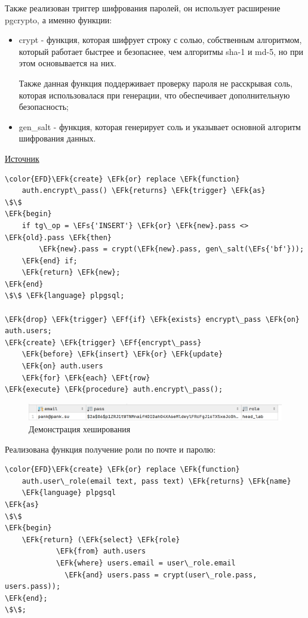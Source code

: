 \documentclass[14pt]{extarticle}
\newcommand{\EFs}[1]{\textcolor{EFs}{#1}} %
\newcommand{\EFk}[1]{\textcolor{EFk}{#1}} %
\newcommand{\EFf}[1]{\textcolor{EFf}{#1}} %
\newcommand{\EFt}[1]{\textcolor{EFt}{#1}} %
\begin{document}
Также реализован триггер шифрования паролей, он использует расширение pgcrypto, а
именно функции:
\begin{itemize}
\item crypt - функция, которая шифрует строку с солью,
собственным алгоритмом, который работает быстрее и безопаснее,
чем алгоритмы sha-1 и md-5, но при этом основывается на них.

Также данная функция поддерживает проверку пароля не расскрывая соль, которая использовалася при генерации,
что обеспечивает дополнительную безопасность;
\item gen\_​salt - функция, которая генерирует соль и указывает основной алгоритм шифрования данных.
\end{itemize}

\href{https://www.postgresql.org/docs/current/pgcrypto.html}{Источник}

\begin{Code}
\begin{Verbatim}
\color{EFD}\EFk{create} \EFk{or} replace \EFk{function}
    auth.encrypt\_pass() \EFk{returns} \EFk{trigger} \EFk{as}
\$\$
\EFk{begin}
    if tg\_op = \EFs{'INSERT'} \EFk{or} \EFk{new}.pass <> \EFk{old}.pass \EFk{then}
        \EFk{new}.pass = crypt(\EFk{new}.pass, gen\_salt(\EFs{'bf'}));
    \EFk{end} if;
    \EFk{return} \EFk{new};
\EFk{end}
\$\$ \EFk{language} plpgsql;

\EFk{drop} \EFk{trigger} \EFf{if} \EFk{exists} encrypt\_pass \EFk{on} auth.users;
\EFk{create} \EFk{trigger} \EFf{encrypt\_pass}
    \EFk{before} \EFk{insert} \EFk{or} \EFk{update}
    \EFk{on} auth.users
    \EFk{for} \EFk{each} \EFt{row}
\EFk{execute} \EFk{procedure} auth.encrypt\_pass();
\end{Verbatim}
\end{Code}

\begin{figure}[H]
\centering
\includegraphics[width=.9\linewidth]{images/2023-05-02_09-57-33_screenshot.png}
\caption{Демонстрация хеширования}
\end{figure}


Реализована функция получение роли по почте и паролю:

\begin{Code}
\begin{Verbatim}
\color{EFD}\EFk{create} \EFk{or} replace \EFk{function}
    auth.user\_role(email text, pass text) \EFk{returns} \EFk{name}
    \EFk{language} plpgsql
\EFk{as}
\$\$
\EFk{begin}
    \EFk{return} (\EFk{select} \EFk{role}
            \EFk{from} auth.users
            \EFk{where} users.email = user\_role.email
              \EFk{and} users.pass = crypt(user\_role.pass, users.pass));
\EFk{end};
\$\$;
\end{Verbatim}
\end{Code}
\end{document}
